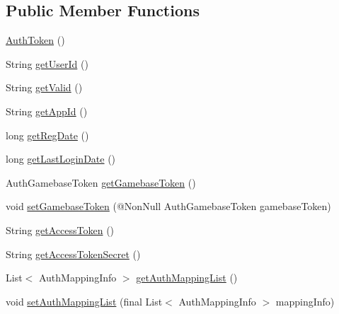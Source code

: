 \subsection*{Public Member Functions}
\begin{DoxyCompactItemize}
\item 
\hyperlink{classcom_1_1toast_1_1android_1_1gamebase_1_1auth_1_1data_1_1_auth_token_a5847a054f330f4633df0146edeba445e}{Auth\+Token} ()
\item 
String \hyperlink{classcom_1_1toast_1_1android_1_1gamebase_1_1auth_1_1data_1_1_auth_token_a1a86b0102452494152fce9535952e4f4}{get\+User\+Id} ()
\item 
String \hyperlink{classcom_1_1toast_1_1android_1_1gamebase_1_1auth_1_1data_1_1_auth_token_af6527912d52486ab15647492fc1efd89}{get\+Valid} ()
\item 
String \hyperlink{classcom_1_1toast_1_1android_1_1gamebase_1_1auth_1_1data_1_1_auth_token_a240d4abd81a68efe7d3b9e10537763f5}{get\+App\+Id} ()
\item 
long \hyperlink{classcom_1_1toast_1_1android_1_1gamebase_1_1auth_1_1data_1_1_auth_token_a9532e1636d0dfc2bee56231288f3eb43}{get\+Reg\+Date} ()
\item 
long \hyperlink{classcom_1_1toast_1_1android_1_1gamebase_1_1auth_1_1data_1_1_auth_token_a3e6149a376b84d624d870b98d7d5d0c7}{get\+Last\+Login\+Date} ()
\item 
Auth\+Gamebase\+Token \hyperlink{classcom_1_1toast_1_1android_1_1gamebase_1_1auth_1_1data_1_1_auth_token_aacb53e69ee9426bcde965e1e7b71a24c}{get\+Gamebase\+Token} ()
\item 
void \hyperlink{classcom_1_1toast_1_1android_1_1gamebase_1_1auth_1_1data_1_1_auth_token_ad41eb50dce69a6ee53cc496b6054928c}{set\+Gamebase\+Token} (@Non\+Null Auth\+Gamebase\+Token gamebase\+Token)
\item 
String \hyperlink{classcom_1_1toast_1_1android_1_1gamebase_1_1auth_1_1data_1_1_auth_token_ae5d68509be41985a7f70a8fb907a576a}{get\+Access\+Token} ()
\item 
String \hyperlink{classcom_1_1toast_1_1android_1_1gamebase_1_1auth_1_1data_1_1_auth_token_a2f7a6155ef340f2ff7922b6ace1df44a}{get\+Access\+Token\+Secret} ()
\item 
List$<$ Auth\+Mapping\+Info $>$ \hyperlink{classcom_1_1toast_1_1android_1_1gamebase_1_1auth_1_1data_1_1_auth_token_afc189ebb8fdc52a6d5428a80055b767a}{get\+Auth\+Mapping\+List} ()
\item 
void \hyperlink{classcom_1_1toast_1_1android_1_1gamebase_1_1auth_1_1data_1_1_auth_token_ae4eb9c89ac0d29ae46eef90ee1d552b0}{set\+Auth\+Mapping\+List} (final List$<$ Auth\+Mapping\+Info $>$ mapping\+Info)

\end{DoxyCompactItemize}
